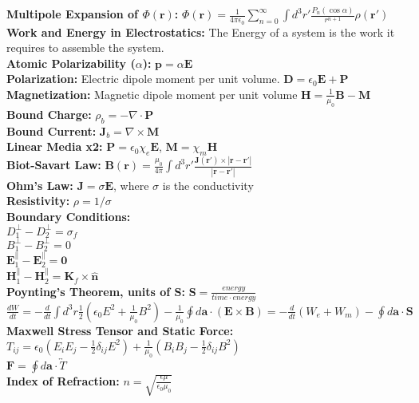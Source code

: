 \documentclass[12pt]{extarticle}
\newcommand{\E}{\mathbf{E}}
\newcommand{\B}{\mathbf{B}}
\newcommand{\D}{\mathbf{D}}
\renewcommand{\H}{\mathbf{H}}
\newcommand{\J}{\mathbf{J}}
\newcommand{\K}{\mathbf{K}}
\newcommand{\F}{\mathbf{F}}
\renewcommand{\P}{\mathbf{P}}
\newcommand{\M}{\mathbf{M}}
\renewcommand{\r}{\mathbf{r}}
\newcommand{\wavr}{\left|\r-\r'\right|}
\begin{document}
\textbf{Multipole Expansion of $\Phi(\mathbf{r})$:} $\Phi(\mathbf{r}) = \frac{1}{4\pi\epsilon_0}\sum\limits_{n=0}^\infty \int d^3r' \frac{P_n(\cos\alpha)}{r^{n+1}} \rho(\mathbf{r}')$ \\
\textbf{Work and Energy in Electrostatics:} The Energy of a system is the work it requires to assemble the system. \\
\textbf{Atomic Polarizability ($\alpha$):} $\mathbf{p} = \alpha \E$ \\
\textbf{Polarization:} Electric dipole moment per unit volume. $\D = \epsilon_0\E+\P$ \\
\textbf{Magnetization:} Magnetic dipole moment per unit volume $\H = \frac{1}{\mu_0}\B - \M$ \\
\textbf{Bound Charge:} $\rho_b = -\nabla\cdot\P$ \\
\textbf{Bound Current:} $\J_b = \nabla \times \M$ \\
\textbf{Linear Media x2:} $\P = \epsilon_0 \chi_e \E$, $\M = \chi_m\H$\\
\textbf{Biot-Savart Law:} $\B(\r) = \frac{\mu_0}{4\pi} \int d^3r' \frac{\J(\r')\times\wavr}{\wavr}$ \\
\textbf{Ohm's Law:} $\J = \sigma\E$, where $\sigma$ is the conductivity \\
\textbf{Resistivity:} $\rho = 1/\sigma$ \\
\textbf{Boundary Conditions:} \\
$D_1^\perp-D_2^\perp = \sigma_f$ \\
$B_1^\perp-B_2^\perp = 0$ \\
$\E_1^\parallel-\E_2^\parallel = \mathbf{0}$ \\
$\H_1^\parallel-\H_2^\parallel = \K_f\times\hat{\mathbf{n}}$ \\
\textbf{Poynting's Theorem, units of $\mathbf{S}$:} $\mathbf{S} = \frac{energy}{time \cdot energy}$\\
$\frac{dW}{dt} = -\frac{d}{dt}\int d^3r \frac{1}{2}\left( \epsilon_0 E^2 + \frac{1}{\mu_0}B^2 \right) - \frac{1}{\mu_0}\oint d\mathbf{a} \cdot (\E\times\B) = -\frac{d}{dt}(W_e+W_m) - \oint d\mathbf{a}\cdot\mathbf{S}$ \\
\textbf{Maxwell Stress Tensor and Static Force:} \\
$T_{ij} = \epsilon_0\left(E_iE_j-\frac{1}{2}\delta_{ij}E^2\right) + \frac{1}{\mu_0}\left(B_iB_j-\frac{1}{2}\delta_{ij}B^2\right)$ \\
$\F = \oint d\mathbf{a}\cdot\overleftrightarrow{T}$ \\
\textbf{Index of Refraction:} $n = \sqrt{\frac{\epsilon\mu}{\epsilon_0\mu_0}}$ \\
\end{document}
